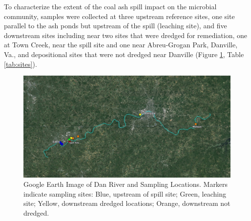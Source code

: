 \documentclass[ms, hidelinks]{uncgdissertationexp}
\theoremstyle{plain}
\theoremstyle{definition}
\theoremstyle{remark}
\begin{document}
To characterize the extent of the coal ash spill impact on the microbial community, samples were collected at three upstream reference sites, one site parallel to the ash ponds but upstream of the spill (leaching site), and five downstream sites including near two sites that were dredged for remediation, one at Town Creek, near the spill site and one near Abreu-Grogan Park, Danville, Va., and depositional sites that were not dredged near Danville (Figure \ref{fig:map}, Table \ref{tab:sites}).
\begin{figure}[H]
\centering
    \includegraphics[width=375pt]{figure/map}
  \singlespace \caption[Google Earth Image of Dan River and Sampling Locations.]{Google Earth Image of Dan River and Sampling Locations. Markers indicate sampling sites: Blue, upstream of spill site; Green, leaching site; Yellow, downstream dredged locations; Orange, downstream not dredged.}\label{fig:map}
\end{figure}
\end{document}
